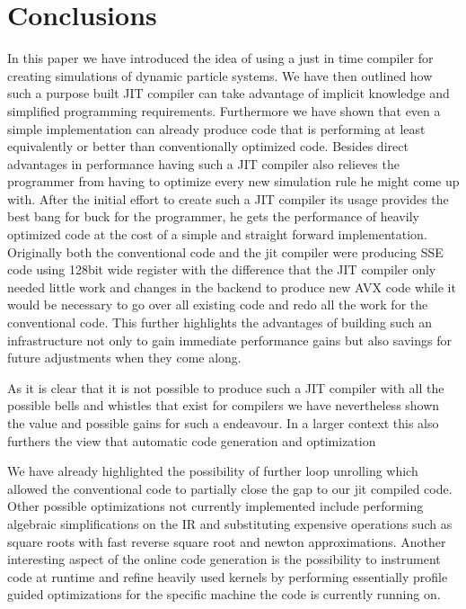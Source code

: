 \section{Conclusions}

In this paper we have introduced the idea of using a just in time compiler for creating simulations of dynamic particle systems. We have then outlined how such a purpose built JIT compiler can take advantage of implicit knowledge and simplified programming requirements. Furthermore we have shown that even a simple implementation can already produce code that is performing at least equivalently or better than conventionally optimized code. Besides direct advantages in performance having such a JIT compiler also relieves the programmer from having to optimize every new simulation rule he might come up with. After the initial effort to create such a JIT compiler its usage provides the best bang for buck for the programmer, he gets the performance of heavily optimized code at the cost of a simple and straight forward implementation. Originally both the conventional code and the jit compiler were producing SSE code using 128bit wide register with the difference that the JIT compiler only needed little work and changes in the backend to produce new AVX code while it would be necessary to go over all existing code and redo all the work for the conventional code. This further highlights the advantages of building such an infrastructure not only to gain immediate performance gains but also savings for future adjustments when they come along.

As it is clear that it is not possible to produce such a JIT compiler with all the possible bells and whistles that exist for compilers we have nevertheless shown the value and possible gains for such a endeavour. In a larger context this also furthers the view that automatic code generation and optimization

 We have already highlighted the possibility of further loop unrolling which allowed the conventional code to partially close the gap to our jit compiled code. Other possible optimizations not currently implemented include performing algebraic simplifications on the IR and substituting expensive operations such as square roots with fast reverse square root and newton approximations. Another interesting aspect of the online code generation is the possibility to instrument code at runtime and refine heavily used kernels by performing essentially profile guided optimizations for the specific machine the code is currently running on.
